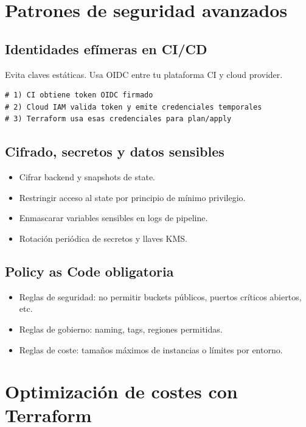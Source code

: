 \documentclass[12pt,a4paper]{article}
\begin{document}
\section{Patrones de seguridad avanzados}

\subsection{Identidades efímeras en CI/CD}
Evita claves estáticas. Usa OIDC entre tu plataforma CI y cloud provider.

\begin{lstlisting}[caption=Idea de flujo seguro con OIDC]
# 1) CI obtiene token OIDC firmado
# 2) Cloud IAM valida token y emite credenciales temporales
# 3) Terraform usa esas credenciales para plan/apply
\end{lstlisting}

\subsection{Cifrado, secretos y datos sensibles}
\begin{itemize}
		\item Cifrar backend y snapshots de state.
		\item Restringir acceso al state por principio de mínimo privilegio.
		\item Enmascarar variables sensibles en logs de pipeline.
		\item Rotación periódica de secretos y llaves KMS.
\end{itemize}

\subsection{Policy as Code obligatoria}
\begin{itemize}
		\item Reglas de seguridad: no permitir buckets públicos, puertos críticos abiertos, etc.
		\item Reglas de gobierno: naming, tags, regiones permitidas.
		\item Reglas de coste: tamaños máximos de instancias o límites por entorno.
\end{itemize}

\section{Optimización de costes con Terraform}
\end{document}
